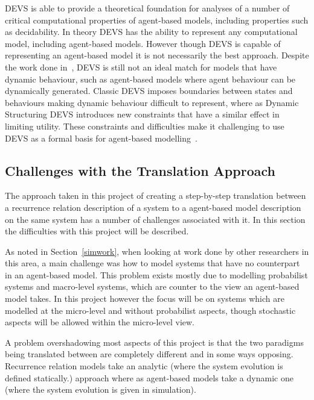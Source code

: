 \documentclass{article}
\begin{document}
DEVS is able to provide a theoretical foundation for analyses of a number of critical computational properties of agent-based models, including properties such as decidability. In theory DEVS has the ability to represent any computational model, including agent-based models. However though DEVS is capable of representing an agent-based model it is not necessarily the best approach. Despite the work done in~\cite{dynamicdevs}, DEVS is still not an ideal match for models that have dynamic behaviour, such as agent-based models where agent behaviour can be dynamically generated. Classic DEVS imposes boundaries between states and behaviours making dynamic behaviour difficult to represent, where as Dynamic Structuring DEVS introduces new constraints that have a similar effect in limiting utility. These constraints and difficulties make it challenging to use DEVS as a formal basis for agent-based modelling~\cite{taabm}.  






\subsection{Challenges with the Translation Approach} \label{twoviewsapproach} 
The approach taken in this project of creating a step-by-step translation between a recurrence relation description of a system to a agent-based model description on the same system has a number of challenges associated with it. In this section the difficulties with this project will be described. 

As noted in Section~\ref{simwork}, when looking at work done by other researchers in this area, a main challenge was how to model systems that have no counterpart in an agent-based model. This problem exists mostly due to modelling probabilist systems and macro-level systems, which are counter to the view an agent-based model takes. In this project however the focus will be on systems which are modelled at the micro-level and without probabilist aspects, though stochastic aspects will be allowed within the micro-level view.

A problem overshadowing most aspects of this project is that the two paradigms being translated between are completely different and in some ways opposing. Recurrence relation models take an analytic (where the system evolution is defined statically.) approach where as agent-based models take a dynamic one (where the system evolution is given in simulation).  %
\end{document}
